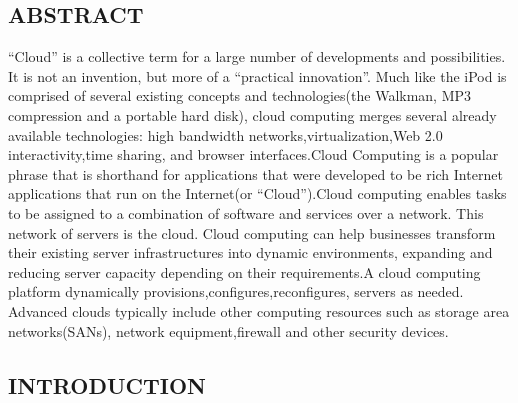 \documentclass[12pt,a4paper]{article}
\begin{document}
\begin{center}
\Large\section*{ABSTRACT}
\end{center}
\begin{spacing}{1.95}
\large “Cloud” is a collective term for a large number of developments and possibilities. It is not an invention, but more of a “practical innovation”. Much like the iPod is comprised of several existing concepts and technologies(the Walkman, MP3 compression and a portable hard disk), cloud computing merges several already available technologies: high bandwidth networks,virtualization,Web 2.0 interactivity,time sharing, and browser interfaces.Cloud Computing is a popular phrase that is shorthand for applications that were developed to be rich Internet applications that run on the Internet(or “Cloud”).Cloud computing enables tasks to be assigned to a combination of software and services over a network. This network of servers is the cloud. Cloud computing can help businesses transform their existing server infrastructures into dynamic environments, expanding and reducing server capacity depending on their requirements.A cloud computing platform dynamically provisions,configures,reconfigures, servers as needed. Advanced clouds typically include other computing resources such as storage area networks(SANs), network equipment,firewall and other security devices.\\
\end{spacing}
\newpage
\begin{center}
\Large\section{INTRODUCTION}
\end{center}
\end{document}
